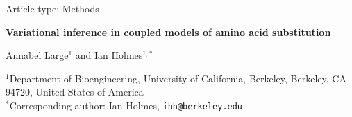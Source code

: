 \documentclass[11pt]{article}
\begin{document}
\doublespacing
\linenumbers

\begin{singlespace}
\thispagestyle{empty}
\begin{center}
{\normalsize Article type: Methods\par}
\vspace{1.5em}
{\Large\bfseries Variational inference in coupled models of amino acid
substitution\par}
\vspace{1.5em}
{\large Annabel Large$^{1}$ and Ian Holmes$^{1,\ast}$\par}
\vspace{1.2em}
\begin{minipage}{0.85\textwidth}\centering
$^{1}$Department of Bioengineering, University of California, Berkeley,
Berkeley, CA 94720, United States of America\\[0.6em]
$^{\ast}$Corresponding author: Ian Holmes, \texttt{ihh@berkeley.edu}
\end{minipage}
\end{center}
\end{singlespace}

\vspace{2em}
\end{document}
